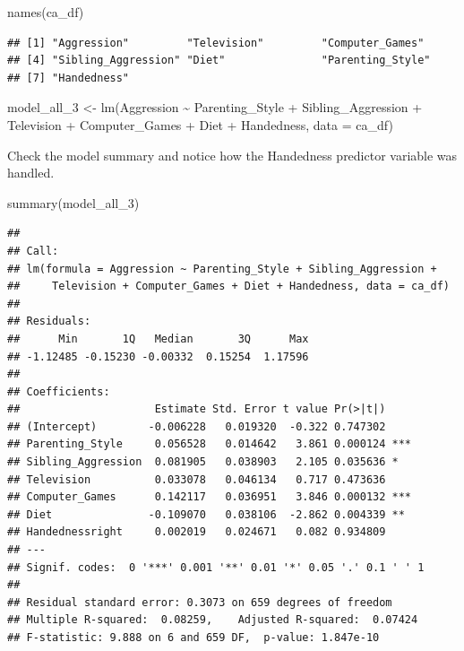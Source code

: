 \documentclass[
]{book}
\newenvironment{Shaded}{\begin{snugshade}}{\end{snugshade}}
\newcommand{\AttributeTok}[1]{\textcolor[rgb]{0.77,0.63,0.00}{#1}}
\newcommand{\FunctionTok}[1]{\textcolor[rgb]{0.00,0.00,0.00}{#1}}
\newcommand{\NormalTok}[1]{#1}
\newcommand{\OtherTok}[1]{\textcolor[rgb]{0.56,0.35,0.01}{#1}}
\newcommand{\SpecialCharTok}[1]{\textcolor[rgb]{0.00,0.00,0.00}{#1}}
\begin{document}
\begin{Shaded}
\begin{Highlighting}[]
\FunctionTok{names}\NormalTok{(ca\_df)}
\end{Highlighting}
\end{Shaded}

\begin{verbatim}
## [1] "Aggression"         "Television"         "Computer_Games"    
## [4] "Sibling_Aggression" "Diet"               "Parenting_Style"   
## [7] "Handedness"
\end{verbatim}

\begin{Shaded}
\begin{Highlighting}[]
\NormalTok{model\_all\_3 }\OtherTok{\textless{}{-}} \FunctionTok{lm}\NormalTok{(Aggression }\SpecialCharTok{\textasciitilde{}}\NormalTok{ Parenting\_Style }\SpecialCharTok{+}\NormalTok{ Sibling\_Aggression }\SpecialCharTok{+}\NormalTok{ Television }\SpecialCharTok{+}\NormalTok{ Computer\_Games }\SpecialCharTok{+}\NormalTok{ Diet }\SpecialCharTok{+}\NormalTok{ Handedness, }\AttributeTok{data =}\NormalTok{ ca\_df)}
\end{Highlighting}
\end{Shaded}

Check the model summary and notice how the Handedness predictor variable was handled.

\begin{Shaded}
\begin{Highlighting}[]
\FunctionTok{summary}\NormalTok{(model\_all\_3)}
\end{Highlighting}
\end{Shaded}

\begin{verbatim}
## 
## Call:
## lm(formula = Aggression ~ Parenting_Style + Sibling_Aggression + 
##     Television + Computer_Games + Diet + Handedness, data = ca_df)
## 
## Residuals:
##      Min       1Q   Median       3Q      Max 
## -1.12485 -0.15230 -0.00332  0.15254  1.17596 
## 
## Coefficients:
##                     Estimate Std. Error t value Pr(>|t|)    
## (Intercept)        -0.006228   0.019320  -0.322 0.747302    
## Parenting_Style     0.056528   0.014642   3.861 0.000124 ***
## Sibling_Aggression  0.081905   0.038903   2.105 0.035636 *  
## Television          0.033078   0.046134   0.717 0.473636    
## Computer_Games      0.142117   0.036951   3.846 0.000132 ***
## Diet               -0.109070   0.038106  -2.862 0.004339 ** 
## Handednessright     0.002019   0.024671   0.082 0.934809    
## ---
## Signif. codes:  0 '***' 0.001 '**' 0.01 '*' 0.05 '.' 0.1 ' ' 1
## 
## Residual standard error: 0.3073 on 659 degrees of freedom
## Multiple R-squared:  0.08259,    Adjusted R-squared:  0.07424 
## F-statistic: 9.888 on 6 and 659 DF,  p-value: 1.847e-10
\end{verbatim}
\end{document}
